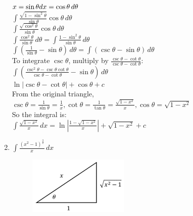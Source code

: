 \documentclass[../main.tex]{subfiles}
\begin{document}
\begin{enumerate}
    \(x=\sin{\theta}\\
    dx=\cos{\theta}\,d\theta\)\\

    \(\int \frac{\sqrt{1-\sin^2{\theta}}}{\sin{\theta}}\cos{\theta}\,d\theta\)\\

    \(\int \frac{\sqrt{\cos^2{\theta}}}{\sin{\theta}}\cos{\theta}\,d\theta\)\\

    \(\int \frac{\cos^2{\theta}}{\sin{\theta}}\,d\theta=\int \frac{1-\sin^2{\theta}}{\sin{\theta}}\,d\theta\)\\

    \(\int (\frac{1}{\sin{\theta}}-\sin{\theta})\,d\theta=\int (\csc{\theta}-\sin{\theta})\,d\theta\)\\

    To integrate \(\csc{\theta}\), multiply by \(\frac{\csc{\theta}-\cot{\theta}}{\csc{\theta}-\cot{\theta}}\):\\

    \(\int (\frac{\csc^2{\theta}-\csc{\theta}\cot{\theta}}{\csc{\theta}-\cot{\theta}}-\sin{\theta})\,d\theta\)\\

    \(\ln{|\csc{\theta}-\cot{\theta}|+\cos{\theta}}+c\)\\

    From the original triangle,\\
    \(\csc{\theta}=\frac{1}{\sin{\theta}}=\frac{1}{x}, \cot{\theta}=\frac{1}{\tan{\theta}}=\frac{\sqrt{1-x^2}}{x}, \cos{\theta}=\sqrt{1-x^2}\)\\

    So the integral is:\\
    \(\int \frac{\sqrt{1-x^2}}{x}\,dx=\ln{|\frac{1-\sqrt{1-x^2}}{x}|}+\sqrt{1-x^2}+c\)\\

    \item 
    \(\int \frac{(x^2-1)^{\frac{3}{2}}}{x}\,dx\)\\
    \begin{figure}[h]
        \includegraphics{images/trigsuba10.png}
    \end{figure}


\end{enumerate}
\end{document}
